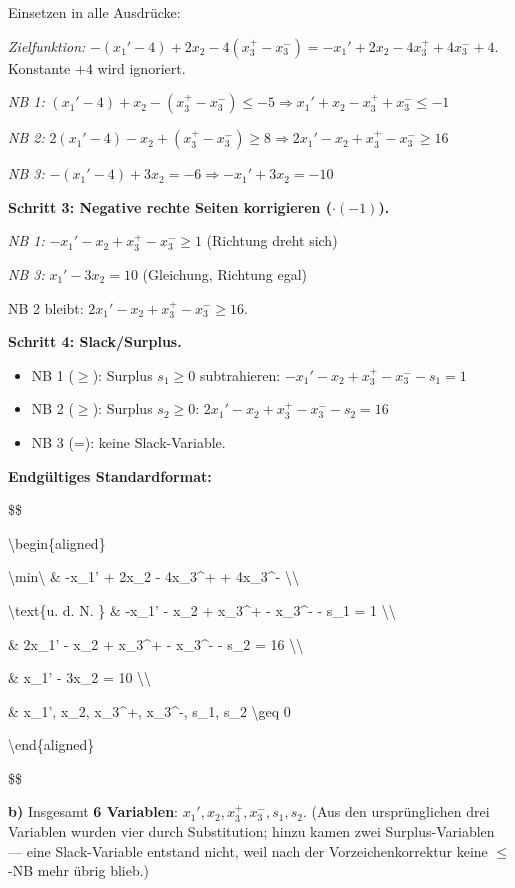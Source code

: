 \documentclass[11pt, a4paper]{article}
\begin{document}
Einsetzen in alle Ausdrücke:


\textit{Zielfunktion:} $-(x_1' - 4) + 2x_2 - 4(x_3^+ - x_3^-) = -x_1' + 2x_2 - 4x_3^+ + 4x_3^- + 4$. Konstante $+4$ wird ignoriert.


\textit{NB 1:} $(x_1' - 4) + x_2 - (x_3^+ - x_3^-) \leq -5 \Rightarrow x_1' + x_2 - x_3^+ + x_3^- \leq -1$


\textit{NB 2:} $2(x_1' - 4) - x_2 + (x_3^+ - x_3^-) \geq 8 \Rightarrow 2x_1' - x_2 + x_3^+ - x_3^- \geq 16$


\textit{NB 3:} $-(x_1' - 4) + 3x_2 = -6 \Rightarrow -x_1' + 3x_2 = -10$


\textbf{Schritt 3: Negative rechte Seiten korrigieren ($\cdot (-1)$).}


\textit{NB 1:} $-x_1' - x_2 + x_3^+ - x_3^- \geq 1$ (Richtung dreht sich)

\textit{NB 3:} $x_1' - 3x_2 = 10$ (Gleichung, Richtung egal)


NB 2 bleibt: $2x_1' - x_2 + x_3^+ - x_3^- \geq 16$.


\textbf{Schritt 4: Slack/Surplus.}


\begin{itemize}
  \item NB 1 ($\geq$): Surplus $s_1 \geq 0$ subtrahieren: $-x_1' - x_2 + x_3^+ - x_3^- - s_1 = 1$
  \item NB 2 ($\geq$): Surplus $s_2 \geq 0$: $2x_1' - x_2 + x_3^+ - x_3^- - s_2 = 16$
  \item NB 3 (=): keine Slack-Variable.
\end{itemize}

\textbf{Endgültiges Standardformat:}


\$\$

\textbackslash{}begin\{aligned\}

\textbackslash{}min\textbackslash{} \& -x\_1' + 2x\_2 - 4x\_3\textasciicircum{}+ + 4x\_3\textasciicircum{}- \textbackslash{}\textbackslash{}

\textbackslash{}text\{u. d. N. \} \& -x\_1' - x\_2 + x\_3\textasciicircum{}+ - x\_3\textasciicircum{}- - s\_1 = 1 \textbackslash{}\textbackslash{}

\& 2x\_1' - x\_2 + x\_3\textasciicircum{}+ - x\_3\textasciicircum{}- - s\_2 = 16 \textbackslash{}\textbackslash{}

\& x\_1' - 3x\_2 = 10 \textbackslash{}\textbackslash{}

\& x\_1', x\_2, x\_3\textasciicircum{}+, x\_3\textasciicircum{}-, s\_1, s\_2 \textbackslash{}geq 0

\textbackslash{}end\{aligned\}

\$\$


\textbf{b)} Insgesamt \textbf{6 Variablen}: $x_1', x_2, x_3^+, x_3^-, s_1, s_2$. (Aus den ursprünglichen drei Variablen wurden vier durch Substitution; hinzu kamen zwei Surplus-Variablen — eine Slack-Variable entstand nicht, weil nach der Vorzeichenkorrektur keine $\leq$-NB mehr übrig blieb.)





\end{document}
